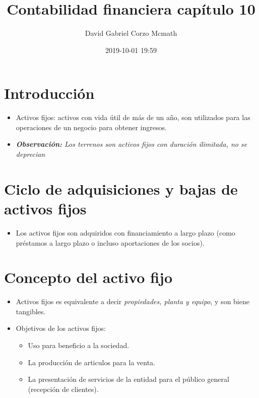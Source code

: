 \documentclass{article}
\author{David Gabriel Corzo Mcmath}
\title{Contabilidad financiera capítulo 10}
\date{2019-10-01 19:59}
\begin{document}
\maketitle

\section{Introducción}
\begin{itemize}
    \item Activos fijos: activos con vida útil de más de un año, son utilizados para las operaciones de un negocio para obtener ingresos.
    \item \emph{\textbf{Observación: }Los terrenos son activos fijos con duración ilimitada, no se deprecian}
\end{itemize}

\section{Ciclo de adquisiciones y bajas de activos fijos}
\begin{itemize}
    \item Los activos fijos son adquiridos con financiamiento a largo  plazo (como préstamos a largo plazo o incluso aportaciones de los socios).
\end{itemize}


\section{Concepto del activo fijo}
\begin{itemize}
    \item Activos fijos es equivalente a decir \emph{propiedades, planta y equipo}, y son biene tangibles.
    \item Objetivos de los activos fijos:
        \begin{itemize}
            \item Uso para beneficio a la sociedad.
            \item La producción de articulos para la venta.
            \item La presentación de servicios de la entidad para el público general (recepción de clientes).
        \end{itemize}
\end{itemize}
\end{document}
